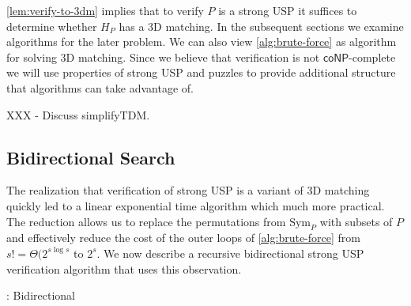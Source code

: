 \documentclass[11pt]{article}
\newcommand\Sym[1]{\ensuremath{\mathrm{Sym}_{#1}}}
\newcommand\coNP{\ensuremath{\mathsf{coNP}}}
\begin{document}
\autoref{lem:verify-to-3dm} implies that to verify $P$ is a strong USP
it suffices to determine whether $H_P$ has a 3D matching.  In the
subsequent sections we examine algorithms for the later problem.  We
can also view \autoref{alg:brute-force} as algorithm for solving 3D
matching.  Since we believe that verification is not \coNP-complete we
will use properties of strong USP and puzzles to provide additional
structure that algorithms can take advantage of.

XXX - Discuss simplifyTDM.

\subsection{Bidirectional Search}

The realization that verification of strong USP is a variant of 3D
matching quickly led to a linear exponential time algorithm which much
more practical.  The reduction allows us to replace the permutations
from $\Sym{P}$ with subsets of $P$ and effectively reduce the cost of
the outer loops of \autoref{alg:brute-force} from $s! =
\Theta(2^{s\log s}$ to $2^s$.  We now describe a recursive
bidirectional strong USP verification algorithm that uses this
observation.

\begin{algorithm}
  \caption{: Bidirectional}
  \label{alg:bi}
\begin{algorithmic}[1]
     
    \Else {}
        \Else {} \EndIf
    \EndIf
  \EndIf    
   
      \EndIf
    \EndFor
  \EndFor
  \EndFunction
  
  \EndFunction
\end{algorithmic}
\end{algorithm}
\end{document}
